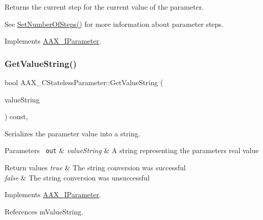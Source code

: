Returns the current step for the current value of the parameter. 

See \mbox{\hyperlink{a01541_a5bf5527cf5ef918923dd21f4ebee6179}{Set\+Number\+Of\+Steps()}} for more information about parameter steps. 

Implements \mbox{\hyperlink{a01857_a9f92e51fce44dbf25a7265286c72d0ea}{A\+A\+X\+\_\+\+I\+Parameter}}.

\mbox{\label{a01541_ad5bdb6216462d9958da46b53ccf45351}} 
\subsubsection{\texorpdfstring{GetValueString()}{GetValueString()}\hspace{0.1cm}{\footnotesize\ttfamily [1/2]}}
{\footnotesize\ttfamily bool A\+A\+X\+\_\+\+C\+Stateless\+Parameter\+::\+Get\+Value\+String (\begin{DoxyParamCaption}\item[{\mbox{\hyperlink{a01573}{A\+A\+X\+\_\+\+C\+String}} $\ast$}]{value\+String }\end{DoxyParamCaption}) const\hspace{0.3cm}{\ttfamily [inline]}, {\ttfamily [virtual]}}



Serializes the parameter value into a string. 


\begin{DoxyParams}[1]{Parameters}
\mbox{\texttt{ out}}  & {\em value\+String} & A string representing the parameter\textquotesingle{}s real value\\
\hline
\end{DoxyParams}

\begin{DoxyRetVals}{Return values}
{\em true} & The string conversion was successful \\
\hline
{\em false} & The string conversion was unsuccessful \\
\hline
\end{DoxyRetVals}


Implements \mbox{\hyperlink{a01857_a0b20c4210f4bb6e6f00de8817051dfb8}{A\+A\+X\+\_\+\+I\+Parameter}}.



References m\+Value\+String.

